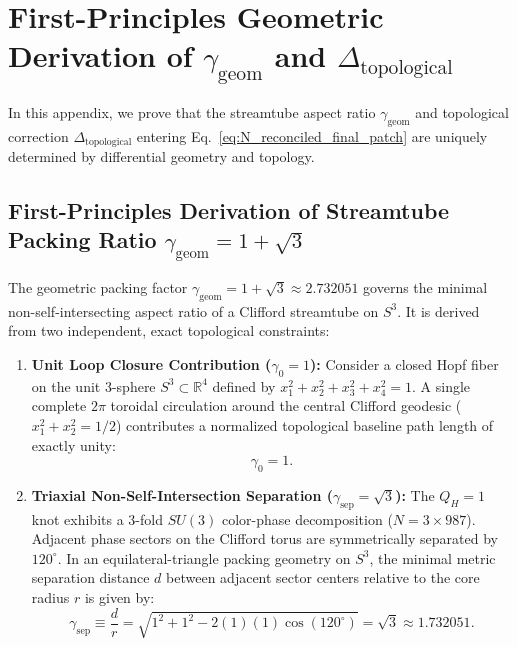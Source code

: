 \documentclass[11pt,a4paper]{article}
\begin{document}
	\appendix
	\section{First-Principles Geometric Derivation of $\gamma_{\text{geom}}$ and $\Delta_{\text{topological}}$}
	\label{app:derivation_verification}
	
	In this appendix, we prove that the streamtube aspect ratio $\gamma_{\text{geom}}$ and topological correction $\Delta_{\text{topological}}$ entering Eq.\ \eqref{eq:N_reconciled_final_patch} are uniquely determined by differential geometry and topology.
	
	\subsection{First-Principles Derivation of Streamtube Packing Ratio $\gamma_{\text{geom}} = 1 + \sqrt{3}$}
	\label{app:gamma_geom_derivation}
	
	The geometric packing factor $\gamma_{\text{geom}} = 1 + \sqrt{3} \approx 2.732051$ governs the minimal non-self-intersecting aspect ratio of a Clifford streamtube on $S^3$. It is derived from two independent, exact topological constraints:
	
	\begin{enumerate}
		\item \textbf{Unit Loop Closure Contribution ($\gamma_0 = 1$):} Consider a closed Hopf fiber on the unit 3-sphere $S^3 \subset \mathbb{R}^4$ defined by $x_1^2 + x_2^2 + x_3^2 + x_4^2 = 1$. A single complete $2\pi$ toroidal circulation around the central Clifford geodesic ($x_1^2 + x_2^2 = 1/2$) contributes a normalized topological baseline path length of exactly unity:
		\begin{equation}
			\gamma_0 = 1.
			\label{eq:gamma_0_unit}
		\end{equation}
		
		\item \textbf{Triaxial Non-Self-Intersection Separation ($\gamma_{\text{sep}} = \sqrt{3}$):} The $Q_H = 1$ knot exhibits a 3-fold $SU(3)$ color-phase decomposition ($N = 3 \times 987$). Adjacent phase sectors on the Clifford torus are symmetrically separated by $120^\circ$. In an equilateral-triangle packing geometry on $S^3$, the minimal metric separation distance $d$ between adjacent sector centers relative to the core radius $r$ is given by:
		\begin{equation}
			\gamma_{\text{sep}} \equiv \frac{d}{r} = \sqrt{1^2 + 1^2 - 2(1)(1)\cos(120^\circ)} = \sqrt{3} \approx 1.732051.
			\label{eq:gamma_sep_sqrt3}
		\end{equation}
	\end{enumerate}
	
\end{document}
